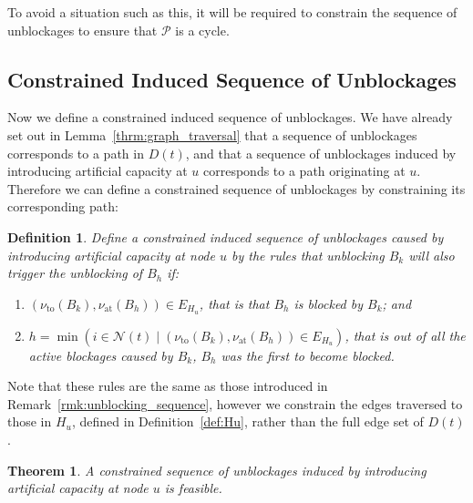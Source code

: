 \documentclass{article}
\newtheorem{definition}{Definition}
\newtheorem{theorem}{Theorem}
\begin{document}
To avoid a situation such as this, it will be required to constrain the sequence
of unblockages to ensure that $\mathcal{P}$ is a cycle.

\subsection{Constrained Induced Sequence of Unblockages}
Now we define a constrained induced sequence of unblockages.
We have already set out in Lemma~\ref{thrm:graph_traversal} that a sequence of
unblockages corresponds to a path in $D(t)$, and that a sequence of unblockages
induced by introducing artificial capacity at $u$ corresponds to a path
originating at $u$.
Therefore we can define a constrained sequence of unblockages by constraining
its corresponding path: 

\begin{definition}\label{def:constrained_unblockages}
Define a constrained induced sequence of unblockages caused by introducing
artificial capacity at node $u$ by the rules that unblocking $B_k$ will also
trigger the unblocking of $B_h$ if:
\begin{enumerate}
  \item \label{pnt:necessity_eulerian}
  $(\nu_{\text{to}}(B_k), \nu_{\text{at}}(B_h)) \in E_{H_u}$, that is that $B_h$
  is blocked by $B_k$; and
  \item \label{pnt:choice_eulerian}
  $h = \min(i \in \mathcal{N}(t) \; | \; (\nu_{\text{to}}(B_k), \nu_{\text{at}}(B_h)) \in E_{H_u})$,
  that is out of all the active blockages caused by $B_k$, $B_h$ was the first
  to become blocked.
\end{enumerate}
\end{definition}

Note that these rules are the same as those introduced in
Remark~\ref{rmk:unblocking_sequence}, however we constrain the edges traversed
to those in $H_u$, defined in Definition~\ref{def:Hu}, rather than the full edge
set of $D(t)$.

\begin{theorem}
A constrained sequence of unblockages induced by introducing artificial capacity
at node $u$ is feasible.
\end{theorem}
\end{document}
